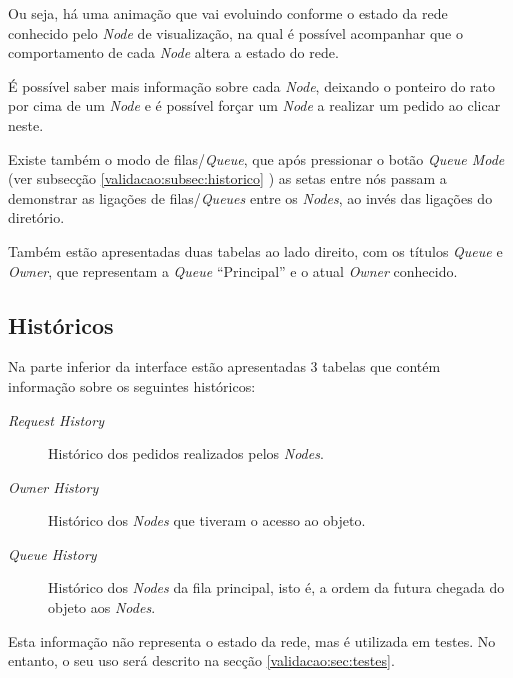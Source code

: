 Ou seja, há uma animação que vai evoluindo conforme o estado da rede conhecido pelo \emph{Node} de visualização, na qual é possível acompanhar que o comportamento de cada \emph{Node} altera a estado do rede.

É possível saber mais informação sobre cada \emph{Node}, deixando o ponteiro do rato por cima de um \emph{Node} e é possível forçar um \emph{Node} a realizar um pedido ao clicar neste.

Existe também o modo de filas/\emph{Queue}, que após pressionar o botão \emph{Queue Mode} (ver subsecção \ref{validacao:subsec:historico}
) as setas entre nós passam a demonstrar as ligações de filas/\emph{Queues} entre os \emph{Nodes}, ao invés das ligações do diretório.

Também estão apresentadas duas tabelas ao lado direito, com os títulos \emph{Queue} e \emph{Owner}, que representam a \emph{Queue} ``Principal'' e o atual \emph{Owner} conhecido.

\subsection*{Históricos}
\label{validacao:subsec:historico}
Na parte inferior da interface estão apresentadas 3 tabelas que contém informação sobre os seguintes históricos:
\begin{description}
    \item [\emph{Request History}] Histórico dos pedidos realizados pelos \emph{Nodes}.
    \item [\emph{Owner History}] Histórico dos \emph{Nodes} que tiveram o acesso ao objeto.
    \item [\emph{Queue History}] Histórico dos \emph{Nodes} da fila principal, isto é, a ordem da futura chegada do objeto aos \emph{Nodes}.
\end{description}

Esta informação não representa o estado da rede, mas é utilizada em testes. No entanto, o seu uso será descrito na secção \ref{validacao:sec:testes}.

